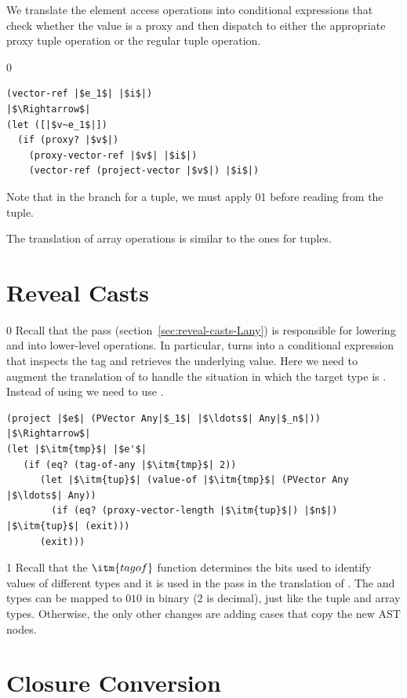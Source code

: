 \documentclass[7x10]{TimesAPriori_MIT}%
\def\racketEd{0}
\def\pythonEd{1}
\def\edition{1}
\newcommand{\racket}[1]{{\if\edition\racketEd{#1}\fi}}
\newcommand{\pythonColor}[0]{}
\newcommand{\python}[1]{{\if\edition\pythonEd\pythonColor #1\fi}}
\numberwithin{theorem}{chapter}
\numberwithin{definition}{chapter}
\numberwithin{equation}{chapter}
\begin{document}
We translate the element access operations into conditional
expressions that check whether the value is a proxy and then dispatch
to either the appropriate proxy tuple operation or the regular tuple
operation.
{\if\edition\racketEd    
\begin{lstlisting}
(vector-ref |$e_1$| |$i$|)
|$\Rightarrow$|
(let ([|$v~e_1$|])
  (if (proxy? |$v$|)
    (proxy-vector-ref |$v$| |$i$|)
    (vector-ref (project-vector |$v$|) |$i$|)
\end{lstlisting}
\fi}
%
Note that in the branch for a tuple, we must apply
\racket{}\python{} before reading
from the tuple.

The translation of array operations is similar to the ones for tuples.


\section{Reveal Casts}
\label{sec:reveal-casts-gradual}

{\if\edition\racketEd    
Recall that the  pass
(section~\ref{sec:reveal-casts-Lany}) is responsible for lowering
 and  into lower-level operations.
%
In particular,  turns into a conditional expression that
inspects the tag and retrieves the underlying value.  Here we need to
augment the translation of  to handle the situation in which
the target type is .  Instead of using
 we need to use .
\begin{lstlisting}
(project |$e$| (PVector Any|$_1$| |$\ldots$| Any|$_n$|))
|$\Rightarrow$|
(let |$\itm{tmp}$| |$e'$|
   (if (eq? (tag-of-any |$\itm{tmp}$| 2))
      (let |$\itm{tup}$| (value-of |$\itm{tmp}$| (PVector Any |$\ldots$| Any))
        (if (eq? (proxy-vector-length |$\itm{tup}$|) |$n$|) |$\itm{tup}$| (exit)))
      (exit)))
\end{lstlisting}
\fi}
%
{\if\edition\pythonEd\pythonColor
Recall that the $\itm{tagof}$ function determines the bits used to
identify values of different types and it is used in the 
pass in the translation of . The \PTUPLETYNAME{} and
\PARRAYTYNAME{} types can be mapped to $010$ in binary ($2$ is
decimal), just like the tuple and array types.
\fi}  
%
Otherwise, the only other changes are adding cases that copy the new AST nodes.


\section{Closure Conversion}
\label{sec:closure-conversion-gradual}
\end{document}
